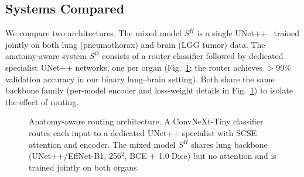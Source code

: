 \documentclass[a4paper,conference]{IEEEtran}
\begin{document}
\subsection{Systems Compared}

We compare two architectures. The mixed model $S^H$ is a single UNet++~\cite{b2} trained jointly on both lung (pneumothorax) and brain (LGG tumor) data. The anatomy-aware system $S^O$ consists of a router classifier followed by dedicated specialist UNet++ networks, one per organ (Fig.~\ref{fig:routing}; the router achieves $>$99\% validation accuracy in our binary lung--brain setting). Both share the same backbone family (per-model encoder and loss-weight details in Fig.~\ref{fig:routing}) to isolate the effect of routing.

\begin{figure}[t]
\centering
{}
\caption{Anatomy-aware routing architecture. A ConvNeXt-Tiny classifier routes each input to a dedicated UNet++ specialist with SCSE attention and encoder. The mixed model $S^H$ shares lung backbone (UNet++/EffNet-B1, 256$^2$, BCE + 1.0$\cdot$Dice) but no attention and is trained jointly on both organs.}
\label{fig:routing}
\end{figure}
\end{document}
